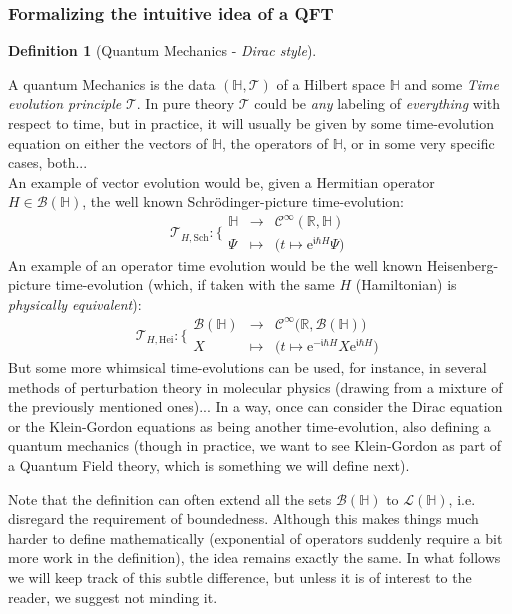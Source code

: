 \documentclass[a4paper,11pt]{article}
\numberwithin{equation}{section}
\theoremstyle{definition}
\newtheorem{definition}{Definition}
\newcommand{\e}{{\mathrm{e}}}
\begin{document}
\subsubsection{Formalizing the intuitive idea of a QFT}
\begin{definition}[Quantum Mechanics - \emph{Dirac style}]$\quad$

A quantum Mechanics is the data $(\mathbb{H},\mathcal{T})$ of a Hilbert space $\mathbb{H}$ and some \emph{Time evolution principle} $\mathcal{T}$. In pure theory $\mathcal{T}$ could be \emph{any} labeling of \emph{everything} with respect to time, but in practice, it will usually be given by some time-evolution equation on either the vectors of $\mathbb{H}$, the operators of $\mathbb{H}$, or in some very specific cases, both...\\
An example of vector evolution would be, given a Hermitian operator $H\in\mathcal{B}(\mathbb{H})$, the well known Schrödinger-picture time-evolution:
$$\boxed{\mathcal{T}_{H,\mathrm{Sch}}: \Bigg\{
\begin{matrix}
\mathbb{H} & \to & \mathcal{C}^\infty(\mathbb{R},\mathbb{H})\\
\Psi & \mapsto & \Big(t\mapsto \e^{\mathfrak{i}\hbar H}\Psi\Big)
\end{matrix}}$$
An example of an operator time evolution would be the well known Heisenberg-picture time-evolution (which, if taken with the same $H$ (Hamiltonian) is \emph{physically equivalent}):
$$\boxed{\mathcal{T}_{H,\mathrm{Hei}}: \Bigg\{
\begin{matrix}
\mathcal{B}(\mathbb{H}) & \to & \mathcal{C}^\infty\big(\mathbb{R},\mathcal{B}(\mathbb{H})\big)\\
X & \mapsto & \Big(t\mapsto \e^{-\mathfrak{i}\hbar H}X\e^{\mathfrak{i}\hbar H}\Big)
\end{matrix}}$$
But some more whimsical time-evolutions can be used, for instance, in several methods of perturbation theory in molecular physics (drawing from a mixture of the previously mentioned ones)... In a way, once can consider the Dirac equation or the Klein-Gordon equations as being another time-evolution, also defining a quantum mechanics (though in practice, we want to see Klein-Gordon as part of a Quantum Field theory, which is something we will define next).

Note that the definition can often extend all the sets $\mathcal{B}(\mathbb{H})$ to $\mathcal{L}(\mathbb{H})$, i.e. disregard the requirement of boundedness. Although this makes things much harder to define mathematically (exponential of operators suddenly require a bit more work in the definition), the idea remains exactly the same. In what follows we will keep track of this subtle difference, but unless it is of interest to the reader, we suggest not minding it.
\end{definition}
\end{document}
